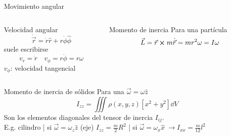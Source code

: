\documentclass[serif]{beamer}
\begin{document}
\begin{frame}{Movimiento angular}
\begin{columns}[c]
	\begin{column}{0.45\textwidth}
		\begin{block}{Velocidad angular}
		\[
			\dot{\vec{r}} = \dot{r} \hat{r} + r \dot{\phi} \hat{\phi}
		\]
		suele escribirse
		\[
			v_r = \dot{r} \quad v_\phi = r \dot{\phi} = r \omega
		\]
		\(v_\phi\): velocidad tangencial
		\end{block}
	\end{column}

	\pause

	\begin{column}{0.45\textwidth}
		\begin{block}{Momento de inercia}
			Para una partícula
			\[
				\vec{L}= \vec{r} \cp m \dot{\vec{r}} = m r^2 \omega= I \omega
			\]
		\end{block}
	\end{column}
\end{columns}
	
	\pause
	\begin{block}{Momento de inercia de sólidos}
		Para una \(\vec{\omega}= \omega \hat{z}\)
		\[
			I_{zz}= \iiint \rho(x,y,z) \left[ x^2+y^2 \right] \dd{V}
		\]
		Son los elementos diagonales del tensor de inercia \(I_{ij}\).\\
		\pause
		E.g. cilindro | si \(\vec{\omega}= \omega_z \hat{z}\) (eje) \(I_{zz}= \frac{m}{2}R^2\) | si \(\vec{\omega}= \omega_x \hat{x}\ \rightarrow I_{xx}= \frac{m}{12} l^2\)
	\end{block}

\end{frame}
\end{document}
